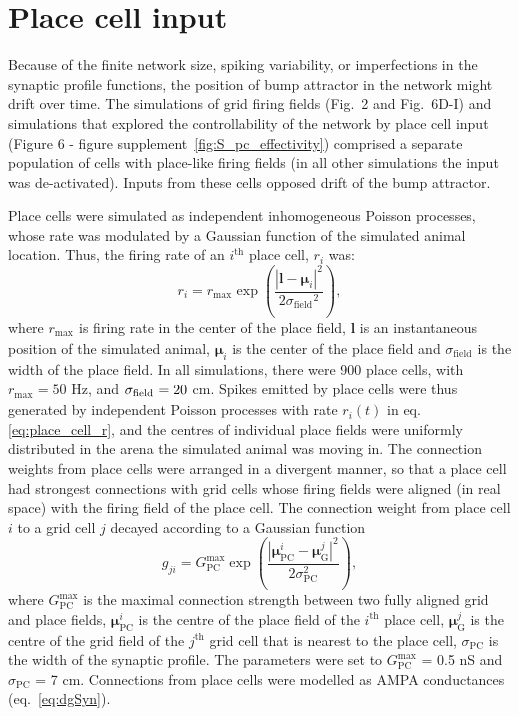 \documentclass[a4paper,12pt]{article}
\newcommand{\ssc}[3]{\ensuremath{#1_{\text{#2}_{\text{#3}}}}}
\newcommand{\sigmasub}[1]{\ssc{\sigma}{\scriptsize{#1}}{}}
\begin{document}
\section{Place cell input} \label{sec:place_cells}

Because of the finite network size, spiking variability, or imperfections in
the synaptic profile functions, the position of bump attractor in the network
might drift over time. The simulations of grid firing fields (Fig.~2 and
Fig.~6D-I) and simulations that explored the controllability of the network by
place cell input (Figure 6 - figure supplement~\ref{fig:S_pc_effectivity})
comprised a separate population of cells with place-like firing fields (in all
other simulations the input was de-activated). Inputs from these cells opposed
drift of the bump attractor.

Place cells were simulated as independent inhomogeneous Poisson processes,
whose rate was modulated by a Gaussian function of the simulated animal
location. Thus, the firing rate of an $i^{\text{th}}$ place cell, $r_i$ was:
\begin{equation}
    r_i = \ssc{r}{max}{} \exp\left( \frac{|\mathbf{l} - \bm{\mu}_i|^2}{2
            \ssc{\sigma}{field}{}^2} \right),
    \label{eq:place_cell_r}
\end{equation}
where $\ssc{r}{max}{}$ is firing rate in the center of the place field,
$\mathbf{l}$ is an instantaneous position of the simulated animal,
$\bm{\mu}_i$ is the center of the place field and
$\ssc{\sigma}{field}{}$ is the width of the place field.
In all simulations,
there were 900 place cells, with $\ssc{r}{max}{} = 50$ Hz, and $\sigmasub{field}
= 20$ cm.  Spikes emitted by place cells were thus generated by independent
Poisson processes with rate $r_i(t)$ in eq. \eqref{eq:place_cell_r}, and the
centres of individual place fields were uniformly distributed in the arena the
simulated animal was moving in.
The connection weights from place cells were arranged in a divergent
manner, so that a place cell had strongest connections with grid cells whose
firing fields were aligned (in real space) with the firing field of the place
cell. The connection weight from place
cell $i$ to a grid cell $j$ decayed according to a Gaussian function
\begin{equation}
    g_{ji} = G_{\text{PC}}^{\text{max}} \exp\left( \frac{|\bm{\mu}_{\text{PC}}^{i} -
    \bm{\mu}_{\text{G}}^j|^2}{2\sigma_\text{PC}^2} \right),
    \label{eq:TG_pc_diverg_conn}
\end{equation}
where $G_{\text{PC}}^{\text{max}}$ is the maximal connection strength between
two fully aligned grid and place fields, $\bm{\mu}_{\text{PC}}^{i}$ is the
centre of the place field of the $i^{\text{th}}$ place cell,
$\bm{\mu}_{\text{G}}^j$ is the centre of the grid field of the $j^{\text{th}}$
grid cell that is nearest to the place cell, $\sigma_\text{PC}$ is the width of
the synaptic profile. The parameters were set to $G_{\text{PC}}^{\text{max}}$ =
0.5 nS and $\sigma_\text{PC}$ = 7 cm. Connections from place cells were modelled
as AMPA conductances (eq.~\ref{eq:dgSyn}).
\end{document}
